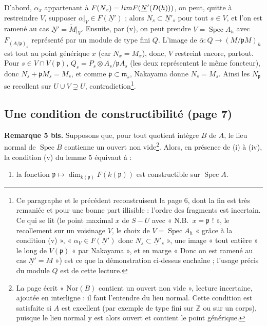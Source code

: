 \documentclass[11pt,a4paper]{article}
\begin{document}
D'abord, $\alpha_x$ appartenant à $F(N_x) = \varinjlim F(\underline{N}'(D(h)))$,
on peut, quitte à restreindre $V$, supposer $\alpha|_V \in F(\underline{N}')$ ;
alors $N_s \subset \underline{N}'_s$ pour tout $s \in V$, et l'on est ramené au
cas $\underline{N}' = \widetilde{M}|_V$. Ensuite, par (v), on peut prendre
$V = \operatorname{Spec} A_h$ avec $F_{(A/\mathfrak{p})_h}$ représenté par un
module de type fini $Q$. L'image de $\bar{\alpha} \colon Q \to
(M/\mathfrak{p}M)_h$ est tout au point générique $x$ (car $N_x = M_x$),
donc, $V$ restreint encore, partout. Pour $s \in V \cap V(\mathfrak{p})$,
$Q_s = P_s \otimes A_s/\mathfrak{p}A_s$ (les deux représentent le même
foncteur), donc $N_s + \mathfrak{p}M_s = M_s$, et comme $\mathfrak{p} \subset
\mathfrak{m}_s$, Nakayama donne $N_s = M_s$. Ainsi les $N_{\mathfrak{p}}$ se
recollent sur $U \cup V \supsetneq U$, contradiction\footnote{Ce paragraphe
et le précédent reconstruisent la page 6, dont la fin est très remaniée et
pour une bonne part illisible : l'ordre des fragments est incertain. Ce qui se
lit (le point maximal $x$ de $S - U$ avec « N.B.\ $x = \mathfrak{p}$ ! »,
le recollement sur un voisinage $V$, le choix de $V = \operatorname{Spec} A_h$
« grâce à la condition (v) », « $\alpha_V \in F(\underline{N}')$ donc $N_s
\subset \underline{N}'_s$ », une image « tout entière » le long de
$V(\mathfrak{p})$ « par Nakayama », et en marge « Donc on est ramené au cas
$\underline{N}' = M$ ») est ce que la démonstration ci-dessus enchaîne ;
l'usage précis du module $Q$ est de cette lecture.}.

\subsection*{Une condition de constructibilité (page 7)}

\textbf{Remarque 5 bis.} Supposons que, pour tout quotient intègre $B$ de $A$,
le lieu normal de $\operatorname{Spec} B$ contienne un ouvert non
vide\footnote{La page écrit « $\mathrm{Nor}(B)$ contient un ouvert non vide »,
lecture incertaine, ajoutée en interligne : il faut l'entendre du lieu normal.
Cette condition est satisfaite si $A$ est excellent (par exemple de type
fini sur $\mathbb{Z}$ ou sur un corps), puisque le lieu normal y est alors
ouvert et contient le point générique.}. Alors, en présence de (i) à (iv), la
condition (v) du lemme 5 équivaut à :
\begin{enumerate}
\item[(v bis)] la fonction $\mathfrak{p} \mapsto
\dim_{k(\mathfrak{p})} F(k(\mathfrak{p}))$ est constructible sur
$\operatorname{Spec} A$.
\end{enumerate}
\end{document}

